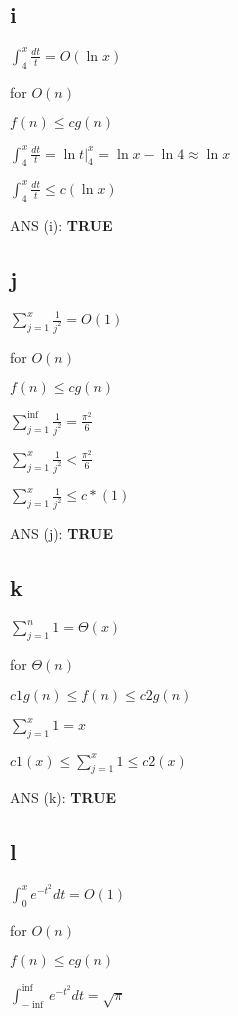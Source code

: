 \documentclass[
]{article}
\begin{document}
\hypertarget{i}{%
\subsection{i}\label{i}}

\(\int_{4}^x \frac{dt}{t} = O(\ln{x})\)

for \(O{(n)}\)

\(f(n) \le c g(n)\)

\(\int_{4}^x \frac{dt}{t} = \ln{t}|_{4}^x = \ln{x} - \ln{4} \approx \ln{x}\)

\(\int_{4}^x \frac{dt}{t} \le c (\ln x)\)

ANS (i): \textbf{TRUE}

\hypertarget{j}{%
\subsection{j}\label{j}}

\(\sum_{j=1}^x \frac {1}{j^2} = O(1)\)

for \(O{(n)}\)

\(f(n) \le cg(n)\)

\(\sum_{j=1}^{\inf}\frac{1}{j^2} = \frac{\pi^2}{6}\)

\(\sum_{j=1}^x \frac{1}{j^2}<\frac{\pi^2}{6}\)

\(\sum_{j=1}^x \frac{1}{j^2}\le c*(1)\)

ANS (j): \textbf{TRUE}

\hypertarget{k}{%
\subsection{k}\label{k}}

\(\sum_{j=1}^n 1 = \Theta(x)\)

for \(\Theta{(n)}\)

\(c1g(n)\le f(n) \le c2g(n)\)

\(\sum_{j=1}^x 1 = x\)

\(c1(x)\le \sum_{j=1}^x 1 \le c2(x)\)

ANS (k): \textbf{TRUE}

\hypertarget{l}{%
\subsection{l}\label{l}}

\(\int_{0}^x e^{-t^2} dt = O(1)\)

for \(O{(n)}\)

\(f(n) \le c g(n)\)

\(\int_{-\inf}^{\inf} e^{-t^2} dt = \sqrt{\pi}\)
\end{document}
